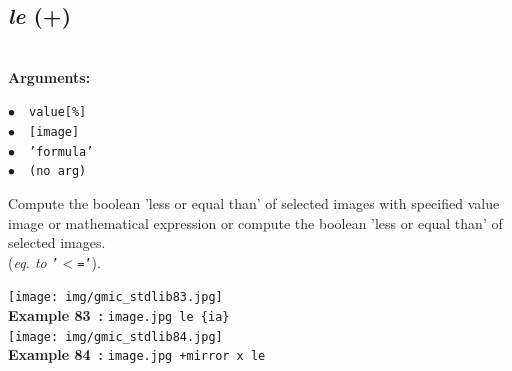 \documentclass[a4paper,10.5pt,twoside]{book}
\def\comma{\discretionary{,}{}{,}}
\newcommand{\Cb}[1]{\textcolor{cb}{#1}}
\begin{document}
\subsection{\emph{le} (+)}\vspace*{-0.7em}
~\\\textbf{\Cb{Arguments: }}\begin{flushleft}
{\small \Cb{\hspace*{0.5cm}$\bullet$~~\texttt{value[\%]}}}~~~\\
{\small \Cb{\hspace*{0.5cm}$\bullet$~~\texttt{[image]}}}~~~\\
{\small \Cb{\hspace*{0.5cm}$\bullet$~~\texttt{'formula'}}}~~~\\
{\small \Cb{\hspace*{0.5cm}$\bullet$~~\texttt{(no arg)}}}\end{flushleft}
Compute the boolean 'less or equal than' of selected images with specified value{\comma} image or
mathematical expression{\comma} or compute the boolean 'less or equal than' of selected images.
~\\(\emph{eq. to} {\small \texttt{'$<$='}}).
\begin{center}\texttt{[image: img/gmic\_stdlib83.jpg]}\\
{\footnotesize \textbf{Example 83~:} \texttt{image.jpg le \{ia\}}}
\\\texttt{[image: img/gmic\_stdlib84.jpg]}\\
{\footnotesize \textbf{Example 84~:} \texttt{image.jpg +mirror x le}}
\end{center}
\end{document}
